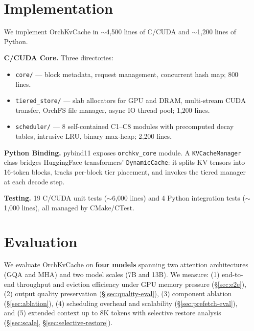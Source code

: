 \documentclass[conference]{IEEEtran}
\begin{document}
\section{Implementation}

We implement OrchKvCache in ${\sim}$4,500 lines of C/CUDA and ${\sim}$1,200 lines of Python.

\textbf{C/CUDA Core.} Three directories:
\begin{itemize}
\item \texttt{core/} --- block metadata, request management, concurrent hash map; 800 lines.
\item \texttt{tiered\_store/} --- slab allocators for GPU and DRAM, multi-stream CUDA transfer, OrchFS file manager, async IO thread pool; 1,200 lines.
\item \texttt{scheduler/} --- 8 self-contained C1--C8 modules with precomputed decay tables, intrusive LRU, binary max-heap; 2,200 lines.
\end{itemize}

\textbf{Python Binding.} pybind11 exposes \texttt{orchkv\_core} module. A \texttt{KVCacheManager} class bridges HuggingFace transformers' \texttt{DynamicCache}: it splits KV tensors into 16-token blocks, tracks per-block tier placement, and invokes the tiered manager at each decode step.

\textbf{Testing.} 19 C/CUDA unit tests (${\sim}$6,000 lines) and 4 Python integration tests (${\sim}$1,000 lines), all managed by CMake/CTest.

\section{Evaluation}

We evaluate OrchKvCache on \textbf{four models} spanning two attention architectures (GQA and MHA) and two model scales (7B and 13B). We measure: (1) end-to-end throughput and eviction efficiency under GPU memory pressure (\S\ref{sec:e2e}), (2) output quality preservation (\S\ref{sec:quality-eval}), (3) component ablation (\S\ref{sec:ablation}), (4) scheduling overhead and scalability (\S\ref{sec:prefetch-eval}), and (5) extended context up to 8K tokens with selective restore analysis (\S\ref{sec:scale}, \S\ref{sec:selective-restore}).
\end{document}
